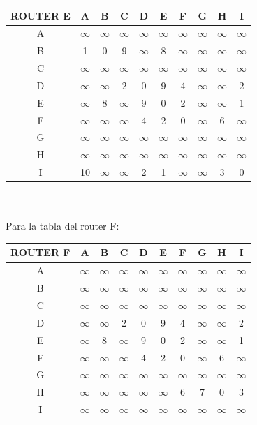 \documentclass{article}
\begin{document}
\begin{tabular}{ | c | c | c | c | c | c | c | c | c | c |}
\hline                 
ROUTER E    & A      & B      & C      & D      & E      & F      & G      & H      & I      \\
\hline
        A   &$\infty$&$\infty$&$\infty$&$\infty$&$\infty$&$\infty$&$\infty$&$\infty$&$\infty$\\
\hline
        B   & 1      & 0      & 9      &$\infty$& 8      &$\infty$&$\infty$&$\infty$&$\infty$\\
\hline
        C   &$\infty$&$\infty$&$\infty$&$\infty$&$\infty$&$\infty$&$\infty$&$\infty$&$\infty$\\
\hline
        D   &$\infty$&$\infty$& 2      & 0      & 9      & 4      &$\infty$&$\infty$& 2      \\
\hline
        E   &$\infty$& 8      &$\infty$& 9      & 0      & 2      &$\infty$&$\infty$& 1      \\
\hline
        F   &$\infty$&$\infty$&$\infty$& 4      & 2      & 0      &$\infty$& 6      &$\infty$\\
\hline
        G   &$\infty$&$\infty$&$\infty$&$\infty$&$\infty$&$\infty$&$\infty$&$\infty$&$\infty$\\
\hline
        H   &$\infty$&$\infty$&$\infty$&$\infty$&$\infty$&$\infty$&$\infty$&$\infty$&$\infty$\\
\hline 
        I   & 10     &$\infty$&$\infty$& 2      & 1      &$\infty$&$\infty$& 3      & 0      \\
\hline
\end{tabular}
\\\\
Para la tabla del router F:\\
\begin{tabular}{ | c | c | c | c | c | c | c | c | c | c |}
\hline                 
ROUTER F    & A      & B      & C      & D      & E      & F      & G      & H      & I      \\
\hline
        A   &$\infty$&$\infty$&$\infty$&$\infty$&$\infty$&$\infty$&$\infty$&$\infty$&$\infty$\\
\hline
        B   &$\infty$&$\infty$&$\infty$&$\infty$&$\infty$&$\infty$&$\infty$&$\infty$&$\infty$\\
\hline
        C   &$\infty$&$\infty$&$\infty$&$\infty$&$\infty$&$\infty$&$\infty$&$\infty$&$\infty$\\
\hline
        D   &$\infty$&$\infty$& 2      & 0      & 9      & 4      &$\infty$&$\infty$& 2      \\
\hline
        E   &$\infty$& 8      &$\infty$& 9      & 0      & 2      &$\infty$&$\infty$& 1      \\
\hline
        F   &$\infty$&$\infty$&$\infty$& 4      & 2      & 0      &$\infty$& 6      &$\infty$\\
\hline
        G   &$\infty$&$\infty$&$\infty$&$\infty$&$\infty$&$\infty$&$\infty$&$\infty$&$\infty$\\
\hline
        H   &$\infty$&$\infty$&$\infty$&$\infty$&$\infty$& 6      & 7      & 0      & 3      \\
\hline 
        I   &$\infty$&$\infty$&$\infty$&$\infty$&$\infty$&$\infty$&$\infty$&$\infty$&$\infty$\\
\hline
\end{tabular}
\end{document}
